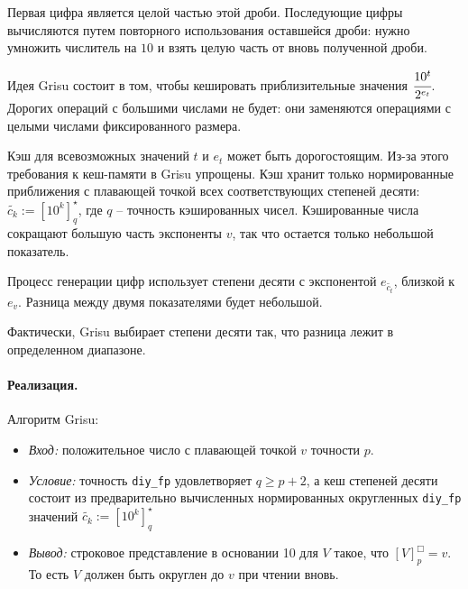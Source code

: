 \documentclass[a4paper, 12pt, twoside]{article}
\begin{document}
Первая цифра является целой частью этой дроби. 
Последующие цифры вычисляются путем повторного использования оставшейся дроби: нужно умножить числитель на $10$ и взять целую часть от вновь полученной дроби.

Идея \textsf{Grisu} состоит в том, чтобы кешировать приблизительные значения $\cfrac{10^t}{2^{e_t}}$.
Дорогих операций с большими числами не будет: они заменяются операциями с целыми числами фиксированного размера.

Кэш для всевозможных значений $t$ и $e_t$ может быть дорогостоящим. 
Из-за этого требования к кеш-памяти в \textsf{Grisu} упрощены. 
Кэш хранит только нормированные приближения с плавающей точкой всех соответствующих степеней десяти: $\tilde{c_k} := \left[ 10^k \right]_q^{\star}$, где $q$ -- точность кэшированных чисел.
Кэшированные числа сокращают большую часть экспоненты $v$, так что остается только небольшой показатель. 

Процесс генерации цифр использует степени десяти с экспонентой $e_{\tilde{c_t}}$, близкой к $e_v$. 
Разница между двумя показателями будет небольшой.

Фактически, \textsf{Grisu} выбирает степени десяти так, что разница лежит в определенном диапазоне. 

\paragraph{Реализация.}
Алгоритм \textsf{Grisu}: \begin{itemize}
\item \textit{Вход:} положительное число с плавающей точкой $v$ точности $p$.
\item \textit{Условие:} точность \texttt{diy\_fp} удовлетворяет $q \geqslant p + 2$, а кеш степеней десяти состоит из предварительно вычисленных нормированных округленных  \texttt{diy\_fp} значений $\tilde{c_k} := \left[ 10^k \right]_q^{\star}$
\item \textit{Вывод:} строковое представление в основании 10 для $V$ такое, что $[V]^{\Box}_p = v$. 
То есть $V$ должен быть округлен до $v$ при чтении вновь.
\end{itemize}
\end{document}
